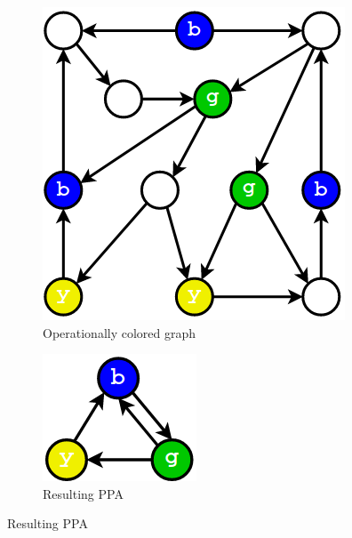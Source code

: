 \begin{figure}[hbt]
 \centering
 \begin{subfigure}[b]{0.4\linewidth}
 \includegraphics[width=\linewidth]{figs/opcoloring.png}
 \caption{Operationally colored graph}
 \end{subfigure}
 \begin{subfigure}[b]{0.3\linewidth}
 \includegraphics[width=\linewidth]{figs/ppa.png}
 \caption{Resulting PPA}
 \end{subfigure}
\label{fig:ppa}
\end{figure}

